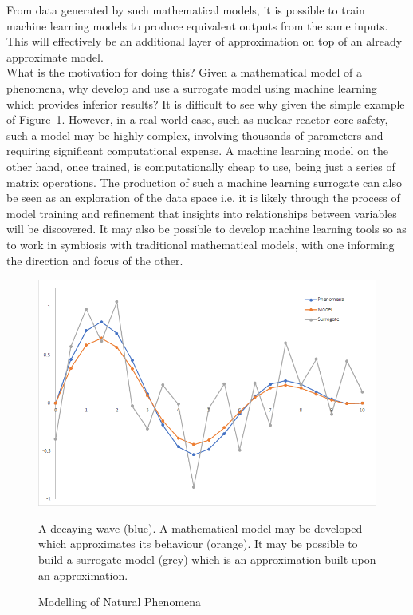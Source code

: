 \noindent
From  data generated by such mathematical models, it is possible to train machine learning models to produce equivalent outputs from the same inputs. This will effectively be an additional layer of approximation on top of an already approximate model.
\\

\noindent
What is the motivation for doing this? Given a mathematical model of a phenomena, why develop and use a surrogate model using machine learning which provides inferior results? It is difficult to see why given the simple example of Figure~\ref{fig:surrogate}. However, in a real world case, such as nuclear reactor core safety, such a model may be highly complex, involving thousands of parameters and requiring significant computational expense. A machine learning model on the other hand, once trained, is computationally cheap to use, being just a series of matrix operations. The production of such a machine learning surrogate can also be seen as an exploration of the data space i.e. it is likely through the process of model training and refinement that insights into relationships between variables will be discovered. It may also be possible to develop machine learning tools so as to work in symbiosis with traditional mathematical models, with one informing the direction and focus of the other.
\\

\begin{figure}[p]
	\centering
	\includegraphics[scale=0.65]{Figures/surrogate_model.png}
	\caption{Modelling of Natural Phenomena} {A decaying wave (blue). A mathematical model may be developed which approximates its behaviour (orange). It may be possible to build a surrogate model (grey) which is an approximation built upon an approximation.}
	\label{fig:surrogate}
\end{figure}

